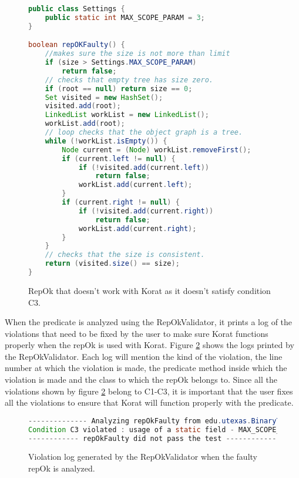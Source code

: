 \begin{figure}
\centering
\begin{lstlisting}[language=Java]
public class Settings {
    public static int MAX_SCOPE_PARAM = 3;
}

boolean repOKFaulty() {
    //makes sure the size is not more than limit
    if (size > Settings.MAX_SCOPE_PARAM) 
        return false;
    // checks that empty tree has size zero.
    if (root == null) return size == 0;
    Set visited = new HashSet();
    visited.add(root);
    LinkedList workList = new LinkedList();
    workList.add(root);
    // loop checks that the object graph is a tree.
    while (!workList.isEmpty()) {
        Node current = (Node) workList.removeFirst();
        if (current.left != null) {
            if (!visited.add(current.left))
                return false;
            workList.add(current.left);
        }
        if (current.right != null) {
            if (!visited.add(current.right))
                return false;
            workList.add(current.right);
        }
    }
    // checks that the size is consistent.
    return (visited.size() == size);
}

\end{lstlisting}
\caption{RepOk that doesn’t work with Korat as it doesn’t satisfy condition C3.}
\label{fig:repOkKoratSatisfyCorrectness}
\end{figure}

\para
When the predicate is analyzed using the RepOkValidator, it prints a log of the violations that need to be fixed by the user to make sure Korat functions properly when the repOk is used with Korat. Figure \ref{fig:repOkKoratSatisfyCorrectnessLog} shows the logs printed by the RepOkValidator. Each log will mention the kind of the violation, the line number at which the violation is made, the predicate method inside which the violation is made and the class to which the repOk belongs to. Since all the violations shown by figure \ref{fig:repOkKoratSatisfyCorrectnessLog} belong to C1-C3, it is important that the user fixes all the violations to ensure that Korat will function properly with the predicate.

\begin{figure}
\centering
\begin{lstlisting}[language=Java]
-------------- Analyzing repOkFaulty from edu.utexas.BinaryTree ------------
Condition C3 violated : usage of a static field - MAX_SCOPE_PARAM from class edu.utexas.BinaryTree$Settings at line 54 inside repOKEfficient in edu.utexas.BinaryTree
------------ repOkFaulty did not pass the test ------------
\end{lstlisting}
\caption{Violation log generated by the RepOkValidator when the faulty repOk is analyzed.}
\label{fig:repOkKoratSatisfyCorrectnessLog}
\end{figure}


